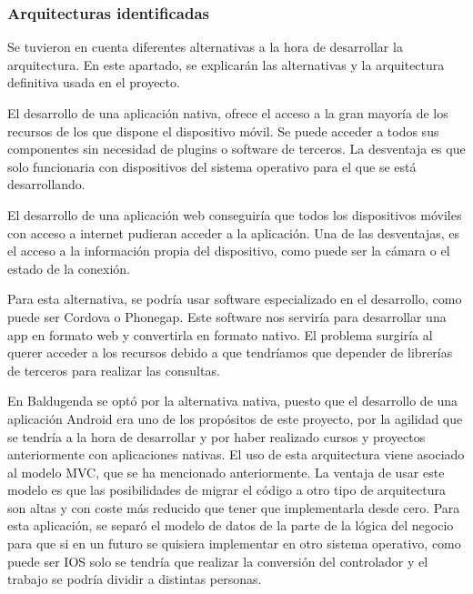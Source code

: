 \newpage
\subsubsection{Arquitecturas identificadas}
\label{subsubsecc:Arquitecturas identificadas}

Se tuvieron en cuenta diferentes alternativas a la hora de desarrollar la arquitectura. En este apartado, se explicarán las alternativas y la arquitectura definitiva usada en el proyecto.


El desarrollo de una aplicación nativa, ofrece el acceso a la gran mayoría de los recursos de los que dispone el dispositivo móvil.
Se puede acceder a todos sus componentes sin necesidad de plugins o software de terceros.
La desventaja es que solo funcionaria con dispositivos del sistema operativo para el que se está desarrollando.


El desarrollo de una aplicación web conseguiría que todos los dispositivos móviles con acceso a internet pudieran acceder a la aplicación.
Una de las desventajas, es el acceso a la información propia del dispositivo, como puede ser la cámara o el estado de la conexión.

Para esta alternativa, se podría usar software especializado en el desarrollo, como puede ser Cordova\cite{Cordova} o Phonegap\cite{Phonegap}. Este software nos serviría para desarrollar una app en formato web y convertirla en formato nativo.
El problema surgiría al querer acceder a los recursos debido a que tendríamos que depender de librerías de terceros para realizar las consultas.

En Baldugenda se optó por la alternativa nativa, puesto que el desarrollo de una aplicación Android era uno de los propósitos de este proyecto, por la agilidad que se tendría a la hora de desarrollar y por haber realizado cursos  y proyectos anteriormente con aplicaciones nativas.
El uso de esta arquitectura viene asociado al modelo MVC, que se ha mencionado anteriormente.  La ventaja de usar este modelo es que las posibilidades de migrar el código a otro tipo de arquitectura son altas y con coste más reducido que tener que implementarla desde cero.
Para esta aplicación, se separó el modelo de datos de la parte de la lógica del negocio para que si en un futuro se quisiera implementar en otro sistema operativo, como puede ser IOS solo se tendría que realizar la conversión del controlador y el trabajo se podría dividir a distintas personas.

